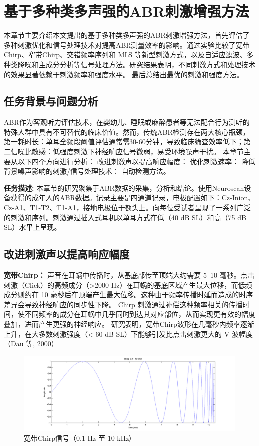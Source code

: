 
\chapter{基于多种类多声强的ABR刺激增强方法}
本章节主要介绍本文提出的基于多种类多声强的ABR刺激增强方法，首先评估了多种刺激优化和信号处理技术对提高ABR测量效率的影响。通过实验比较了宽带Chirp、窄带Chirp、交错频率序列和 MLS 等新型刺激方式，以及自适应滤波、多种类降噪和主成分分析等信号处理方法。研究结果表明，不同刺激方式和处理技术的效果显著依赖于刺激频率和强度水平。
最后总结出最优的刺激和强度方法。

\section{任务背景与问题分析}
ABR作为客观听力评估技术，在婴幼儿、睡眠或麻醉患者等无法配合行为测听的特殊人群中具有不可替代的临床价值。然而，传统ABR检测存在两大核心瓶颈，第一耗时长：单耳全频段阈值评估通常需30-60分钟，导致临床筛查效率低下；第二信噪比敏感：低强度刺激下神经响应信号微弱，易受环境噪声干扰。
本章节主要从以下四个方向进行分析：
改进刺激声以提高响应幅度：
优化刺激速率：
降低背景噪声影响的刺激/信号处理技术：
自动检测方法。


\textbf{任务描述:}
本章节的研究聚集于ABR数据的采集，分析和结论。使用Neuroscan设备获得的成年人的ABR数据。记录主要是四通道记录，电极配置如下：Cz-Inion、Cz-A1、T1-T2、T1-A1，接地电极位于额头上。向每位受试者呈现了一系列广泛的刺激和序列。刺激通过插入式耳机以单耳方式在低（40 dB SL）和高（75 dB SL）水平上呈现。

\section{改进刺激声以提高响应幅度}
\textbf{宽带Chirp：}
声音在耳蜗中传播时，从基底部传至顶端大约需要 5–10 毫秒。点击刺激（Click）的高频成分（>2000 Hz）在耳蜗的基底区域产生最大位移，而低频成分则约在 10 毫秒后在顶端产生最大位移。这种由于频率传播时延而造成的时序差异会导致神经响应的同步性下降。
Chirp 刺激通过补偿这种频率相关的传播时间，使不同频率的成分在耳蜗中几乎同时到达其对应部位，从而实现更有效的幅度叠加，进而产生更强的神经响应。
研究表明，宽带Chirp波形在几毫秒内频率逐渐上升，在大多数刺激强度（< 60 dB SL）下能够引发比点击刺激更大的 V 波幅度（Dau 等, 2000）\cite{dau2000optimized}
\begin{figure}[H]
  \centering
  \includegraphics[width=1\textwidth]{images/Chirp.png}
  \caption{宽带Chirp信号（0.1 Hz 至 10 kHz）}
  \label{fig:ChirpfrequenceRange}
\end{figure}

